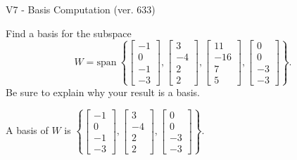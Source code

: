 \begin{exercise}
  \begin{exerciseTitle}V7 - Basis Computation (ver. 633)\end{exerciseTitle}
  \begin{exerciseStatement}
    Find a basis for the subspace 
\[W=\mathrm{span}\ \left\{\left[\begin{array}{r}
-1 \\
0 \\
-1 \\
-3
\end{array}\right] , \left[\begin{array}{r}
3 \\
-4 \\
2 \\
2
\end{array}\right] , \left[\begin{array}{r}
11 \\
-16 \\
7 \\
5
\end{array}\right] , \left[\begin{array}{r}
0 \\
0 \\
-3 \\
-3
\end{array}\right]\right\}.\]
 Be sure to explain why your result is a basis.


  \end{exerciseStatement}
  \begin{exerciseAnswer}
   A basis of \(W\) is  \(\left\{\left[\begin{array}{r}
-1 \\
0 \\
-1 \\
-3
\end{array}\right] , \left[\begin{array}{r}
3 \\
-4 \\
2 \\
2
\end{array}\right] , \left[\begin{array}{r}
0 \\
0 \\
-3 \\
-3
\end{array}\right]\right\}\).
  


  \end{exerciseAnswer}
\end{exercise}